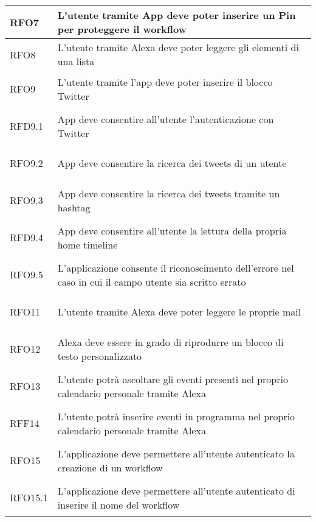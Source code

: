 \begin{longtable}{|>{\centering}m{5em}|m{25em}|}
	\hypertarget{RFO7}{RFO7} & L'utente tramite App deve poter inserire un Pin per proteggere il workflow\\ \hline
	
	\hypertarget{RFO8}{RFO8} & L'utente tramite Alexa deve poter leggere gli elementi di una lista\\ \hline
	
	\hypertarget{RFO9}{RFO9} & L'utente tramite l'app deve poter inserire il blocco Twitter\\ \hline
	
	\hypertarget{RFD9.1}{RFD9.1} & App deve consentire all'utente l'autenticazione con Twitter \\ \hline
	
	\hypertarget{RFO9.2}{RFO9.2} & App deve consentire la ricerca dei tweets di un utente\\ \hline
	
	\hypertarget{RFO9.3}{RFO9.3} & App deve consentire la ricerca dei tweets tramite un hashtag\\ \hline
	
	\hypertarget{RFD9.4}{RFD9.4} & App deve consentire all'utente la lettura della propria home timeline\\ \hline
	
	\hypertarget{RFO9.5}{RFO9.5} & L'applicazione consente il riconoscimento dell'errore nel caso in cui il campo utente sia scritto errato\\ \hline
	
	\hypertarget{RFO11}{RFO11} & L'utente tramite Alexa deve poter leggere le proprie mail\\ \hline
	
	\hypertarget{RFO12}{RFO12} & Alexa deve essere in grado di riprodurre un blocco di testo personalizzato\\ \hline
	
	\hypertarget{RFO13}{RFO13} & L'utente potrà ascoltare gli eventi presenti nel proprio calendario personale tramite Alexa\\ \hline
	
	\hypertarget{RFF14}{RFF14} & L'utente potrà inserire eventi in programma nel proprio calendario personale tramite Alexa\\ \hline
	
	\hypertarget{RFO15}{RFO15} & L'applicazione deve permettere all'utente autenticato la creazione di un workflow\\ \hline
	
	\hypertarget{RFO15.1}{RFO15.1} & L'applicazione deve permettere all'utente autenticato di inserire il nome del workflow\\ \hline
	

\end{longtable}
